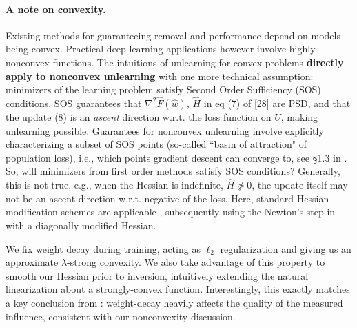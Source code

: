 \paragraph{A note on convexity.}
Existing methods for guaranteeing removal and performance depend on models being convex. Practical deep learning applications however involve highly nonconvex functions.
The intuitions of unlearning for convex problems \textbf{directly apply to nonconvex unlearning} with one more technical assumption: minimizers of the learning problem satisfy Second Order Sufficiency (SOS) conditions. 
SOS guarantees that $ \nabla^2\hat{F}(\hat{w})$, $\hat{H}$ in eq (7) of [28] are PSD, and that the update (8) is an \textit{ascent} direction w.r.t. the loss function on $U$, making unlearning possible. Guarantees for nonconvex unlearning involve explicitly characterizing a subset of SOS points (so-called  ``basin of attraction" of population loss), i.e., which points gradient descent can converge to, see \S1.3 in \cite{Traonmilin_2020}. 
%
So, will minimizers from first order methods satisfy SOS conditions? Generally, this is not true, e.g., when the Hessian is indefinite, $\hat{H}\not\succeq 0$, the update itself may not be an ascent direction w.r.t. negative of the loss. Here, standard Hessian modification schemes are applicable \cite{wright1999numerical}, subsequently using the Newton's step in \cite{sekhari2021remember} with a diagonally modified Hessian.


We fix weight decay during training, acting as $\ell_2$ regularization and giving us an approximate $\lambda$-strong convexity. We also take advantage of this property to smooth our Hessian prior to inversion, intuitively extending the natural linearization about a strongly-convex function. Interestingly, this exactly matches a key conclusion from \cite{basu2021influence}: weight-decay heavily affects the quality of 
the measured influence,  
consistent with our nonconvexity discussion.

